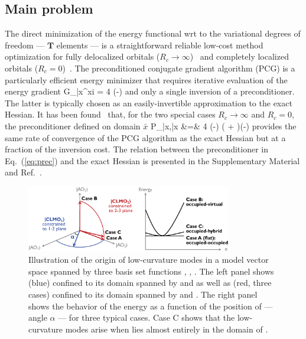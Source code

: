 \documentclass[aps,prl,twocolumn,reprint,amsmath,amssymb]{revtex4-1}
\begin{document}
\subsection{Main problem}

The direct minimization of the energy functional wrt to the variational degrees of freedom --- $\mathbf{T}$ elements --- is a straightforward reliable low-cost method optimization for fully delocalized orbitals ($R_c \rightarrow \infty$)~\cite{galli1992large,OT,GDM, Cayley-minimizer} and completely localized orbitals ($R_c = 0$)~\cite{khaliullin2013efficient}. The preconditioned conjugate gradient algorithm (PCG) is a particularly efficient energy minimizer that requires iterative evaluation of the energy gradient
%
\bea \label{eq:grad}
{G_{\bar{x}\mu}}^{xi} \equiv {} = 4  (-)  
\eea
%
and only a single inversion of a preconditioner. The latter is typically chosen as an easily-invertible approximation to the exact Hessian. It has been found~\cite{khaliullin2013efficient} that, for the two special cases $R_c \rightarrow \infty$ and $R_c = 0$, the preconditioner defined on domain $\bar{x}$
%
\bea \label{eq:prec}
P_{\bar{x}\mu,\bar{x}\nu} &=& 4  (-) ( + )(-)  
\eea
%
provides the same rate of convergence of the PCG algorithm as the exact Hessian but at a fraction of the inversion cost. The relation between the preconditioner in Eq.~(\ref{eq:prec}) and the exact Hessian is presented in the Supplementary Material and Ref.~.

\begin{figure}
\centering
\includegraphics[width=0.8\textwidth]{modes}
\caption{Illustration of the origin of low-curvature modes in a model vector space spanned by three basis set functions , , . The left panel shows  (blue) confined to its domain spanned by  and  as well as   (red, three cases) confined to its domain spanned by  and . The right panel shows the behavior of the energy as a function of the position of  --- angle $\alpha$ --- for three typical cases. Case C shows that the low-curvature modes arise when   lies almost entirely in the domain of .}
\label{fig:modes}
\end{figure}
\end{document}
